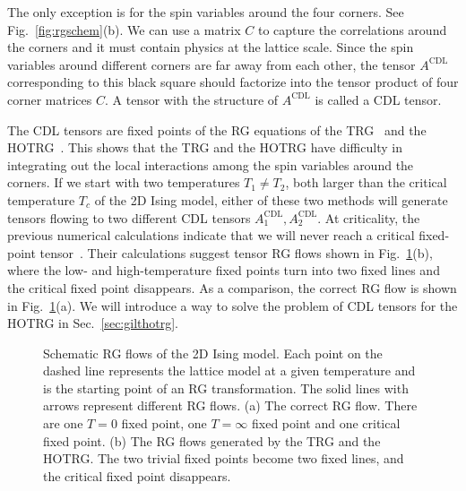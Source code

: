 \documentclass[aps,prr,reprint,superscriptaddress,floatfix]{revtex4-2}
\begin{document}
The only exception is for the spin variables around the four corners.
See Fig.~\ref{fig:rgschem}(b). 
We can use a matrix $C$ to capture the correlations around the corners and it must contain physics at the lattice scale. 
Since the spin variables around different corners are far away from each other, the tensor $A^{\text{CDL}}$ corresponding to this black square should factorize into the tensor product of four corner matrices $C$. 
A tensor with the structure of $A^{\text{CDL}}$ is called a CDL tensor.
%
%

The CDL tensors are fixed points of the RG equations of the TRG~\cite{LevinTalk,GuWen2009,tnr,gilts} and the HOTRG~\cite{hotrgfixpoint}.
This shows that the TRG and the HOTRG have difficulty in integrating out the local interactions among the spin variables around the corners. 
If we start with two temperatures $T_1 \neq T_2$, both larger than the critical temperature $T_c$ of the 2D Ising model, either of these two methods will generate tensors flowing to two different CDL tensors $A^{\text{CDL}}_1, A^{\text{CDL}}_2$. 
At criticality, the previous numerical calculations indicate that we will never reach a critical fixed-point tensor~\cite{Berker2008,tnr}.
Their calculations suggest tensor RG flows shown in Fig.~\ref{fig:tensorRGflow}(b), where the low- and high-temperature fixed points turn into two fixed lines and the critical fixed point disappears. 
As a comparison, the correct RG flow is shown in Fig.~\ref{fig:tensorRGflow}(a).
We will introduce a way to solve the problem of CDL tensors for the HOTRG in Sec.~\ref{sec:gilthotrg}.
%
\begin{figure}[t]
    \caption{\label{fig:tensorRGflow}
        Schematic RG flows of the 2D Ising model.
        Each point on the dashed line represents the lattice model at a given temperature and is the starting point of an RG transformation.
        The solid lines with arrows represent different RG flows.
        (a) The correct RG flow. There are one $T=0$ fixed point, one $T=\infty$ fixed point and one critical fixed point.
        (b) The RG flows generated by the TRG and the HOTRG\@.
        The two trivial fixed points become two fixed lines, and the critical fixed point disappears.
    }
\end{figure}
%
\end{document}
